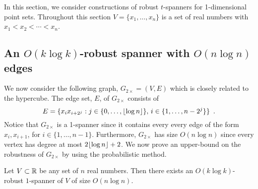 \documentclass{patmorin}
\begin{document}
In this section, we consider constructions of robust $t$-spanners for
1-dimensional point sets.  Throughout this section $V=\{x_1,\ldots,x_n\}$
is a set of real numbers with $x_1<x_2<\cdots<x_n$.

\subsection{An $O(k\log k)$-robust spanner with $O(n\log n)$ edges}

We now consider the following graph, $G_{2\times}=(V,E)$ which is closely related
to the hypercube.   The edge set, $E$, of $G_{2\times}$ consists of
\[
    E = \{x_ix_{i+2^j} : j\in\{0,\ldots,{\lfloor \log n \rfloor}\},\, i\in\{1,\ldots,n-2^j\} \} \enspace .
\] 
Notice that $G_{2\times}$ is a 1-spanner since it contains every every
edge of the form $x_i,x_{i+1}$, for $i\in\{1,\ldots,n-1\}$. Furthermore,
$G_{2\times}$ has size $O(n\log n)$ since every vertex has degree at most
$2{\lfloor \log n \rfloor}+2$.  We now prove an upper-bound on the robustness of
$G_{2\times}$ by using the probabilistic method.

\begin{thm}
Let $V\subset \mathbb{R}$ be any set of $n$ real numbers.  Then there exists an
$O(k\log k)$-robust $1$-spanner of $V$ of size $O(n\log n)$.
\end{thm}
\end{document}
